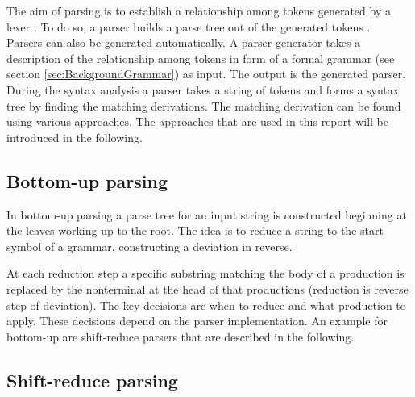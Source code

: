 The aim of parsing is to establish a relationship among tokens generated by a lexer \cite{LexYacc.1992}.
To do so, a parser builds a parse tree out of the generated tokens \cite{Mogensen.2017}.\\
Parsers can also be generated automatically.
A parser generator takes a description of the relationship among tokens in form of a formal grammar (see section \ref{sec:BackgroundGrammar}) as input. The output is the generated parser. \cite{LexYacc.1992}\\
During the syntax analysis a parser takes a string of tokens and forms a syntax tree by finding the matching derivations. The matching derivation can be found using various approaches. The approaches that are used in this report will be introduced in the following.

\subsection{Bottom-up parsing}\label{sec:BackgroundParserBottomUp}

In bottom-up parsing a parse tree for an input string is constructed beginning at the leaves working up to the root. The idea is to reduce a string to the start symbol of a grammar, constructing a deviation in reverse.
\cite{Aho.2007}

At each reduction step a specific substring matching the body of a production is replaced by the nonterminal at the head of that productions (reduction is reverse step of deviation).
The key decisions are when to reduce and what production to apply.
These decisions depend on the parser implementation.
An example for bottom-up are shift-reduce parsers that are described in the following.
\cite{Aho.2007}
\subsection{Shift-reduce parsing}\label{sec:BackgroundParserShiftReduce}

